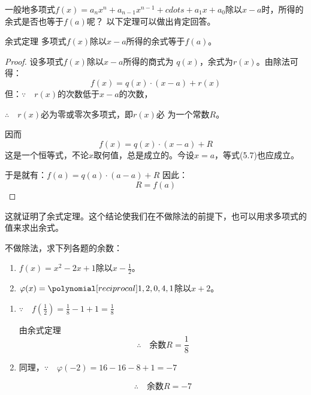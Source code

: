 一般地多项式$f(x)=a_n x^n +a_{n-1}x^{n-1}+cdots+a_1x+a_0$除以$x-a$时，所得的余式是否也等于$f(a)$呢？
以下定理可以做出肯定回答。

\begin{blk}{余式定理}
多项式$f(x)$除以$x-a$所得的余式等于$f(a)$。    
\end{blk}

\begin{proof}
    设多项式$f(x)$除以$x-a$所得的商式为
$q(x)$，余式为$r(x)$。由除法可得：
\[f (x) =q (x)\cdot  (x-a)+r(x)\]
但：$\because\quad r(x)$的次数低于$x-a$的次数，

$\therefore\quad r(x)$必为零或零次多项式，即$r(x)$必
    为一个常数$R$。

因而
\begin{equation}
    f (x) =q (x) \cdot  (x-a) +R
\end{equation}
这是一个恒等式，不论$x$取何值，总是成立的。今设$x=a$，等式(5.7)也应成立。

    于是就有：$f(a)=q(a)\cdot (a-a)+R$
因此： 
\begin{equation}
   R=f (a)  
\end{equation}
\end{proof}

    这就证明了余式定理。这个结论使我们在不做除法的前提下，也可以用求多项式的值来求出余式。


\begin{example}
  不做除法，求下列各题的余数：
  \begin{enumerate}
      \item $f(x)=x^2-2x+1$除以$x-\frac{1}{2}$。
      \item $\varphi(x)=\poly{1,2,0,4,1}$除以$x+2$。
  \end{enumerate}
\end{example}    
    


\begin{solution}
\begin{enumerate}
    \item $\because\quad f\left(\frac{1}{2}\right)=\frac{1}{8}-1+1=\frac{1}{8}$
    
    由余式定理
    \[\therefore\quad \text{余数}R=\frac{1}{8}\]

\item 同理，$\because\quad \varphi(-2)=16-16-8+1=-7$

\[\therefore\quad \text{余数}R=-7\]
\end{enumerate}

    
\end{solution}


